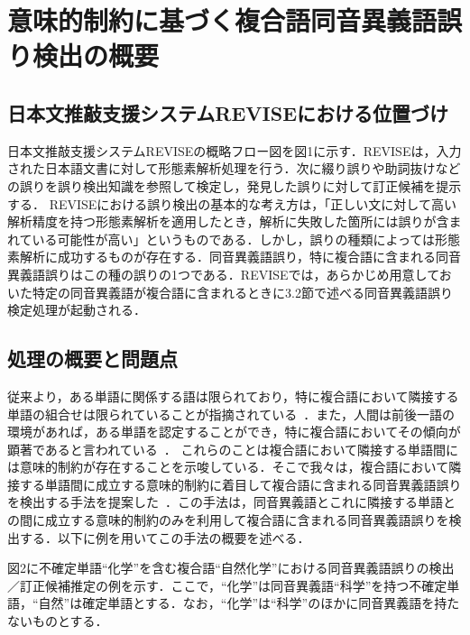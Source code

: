 \section{意味的制約に基づく複合語同音異義語誤り検出の概要}
\subsection{日本文推敲支援システムREVISEにおける位置づけ}
日本文推敲支援システムREVISEの概略フロー図を図1に示す．REVISEは，入力された日本語文書に対して形態素解析処理を行う．次に綴り誤りや助詞抜けなどの誤りを誤り検出知識を参照して検定し，発見した誤りに対して訂正候補を提示する．
REVISEにおける誤り検出の基本的な考え方は，「正しい文に対して高い解析精度を持つ形態素解析を適用したとき，解析に失敗した箇所には誤りが含まれている可能性が高い」というものである．しかし，誤りの種類によっては形態素解析に成功するものが存在する．同音異義語誤り，特に複合語に含まれる同音異義語誤りはこの種の誤りの1つである．REVISEでは，あらかじめ用意しておいた特定の同音異義語が複合語に含まれるときに3.2節で述べる同音異義語誤り検定処理が起動される．


\begin{figure}[ht]
\begin{center}
\end{center}
\end{figure}


\subsection{処理の概要と問題点}
従来より，ある単語に関係する語は限られており，特に複合語において隣接する単語の組合せは限られていることが指摘されている~\cite{TanakaAndMizutaniAndYoshida1984b,TanakaAndYoshida1987}．また，人間は前後一語の環境があれば，ある単語を認定することができ，特に複合語においてその傾向が顕著であると言われている~\cite{Nakano1982}．
これらのことは複合語において隣接する単語間には意味的制約が存在することを示唆している．そこで我々は，複合語において隣接する単語間に成立する意味的制約に着目して複合語に含まれる同音異義語誤りを検出する手法を提案した~\cite{Oku1994,Oku1996}．この手法は，同音異義語とこれに隣接する単語との間に成立する意味的制約のみを利用して複合語に含まれる同音異義語誤りを検出する．以下に例を用いてこの手法の概要を述べる．

図2に不確定単語“化学”を含む複合語“自然化学”における同音異義語誤りの検出／訂正候補推定の例を示す．ここで，“化学”は同音異義語“科学”を持つ不確定単語，“自然”は確定単語とする．なお，“化学”は“科学”のほかに同音異義語を持たないものとする．

